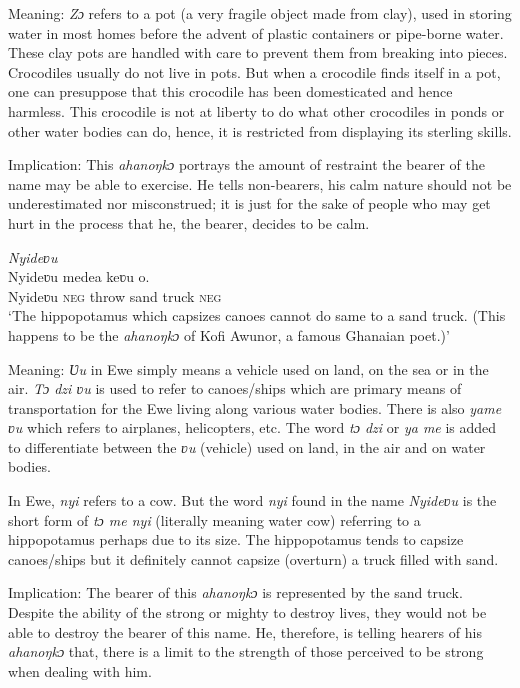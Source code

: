 \documentclass[output=paper]{langscibook}
\begin{document}
\noindent Meaning: \textit{Zɔ} refers to a pot (a very fragile object made from clay), used in storing water in most homes before the advent of plastic containers or pipe-borne water. These clay pots are handled with care to prevent them from breaking into pieces. Crocodiles usually do not live in pots. But when a crocodile finds itself in a pot, one can presuppose that this crocodile has been domesticated and hence harmless. This crocodile is not at liberty to do what other crocodiles in ponds or other water bodies can do, hence, it is restricted from displaying its sterling skills.

Implication: This {\textit{ahanoŋkɔ}} portrays the amount of restraint the bearer of the name may be able to exercise. He tells non-bearers, his calm nature should not be underestimated nor misconstrued; it is just for the sake of people who may get hurt in the process that he, the bearer, decides to be calm.

\ea
 \emph{Nyideʋu}\\
\gll Nyideʋu medea keʋu o.\\
Nyideʋu {\textsc{neg} throw} {sand truck} \textsc{neg}\\
\glt  ‘The hippopotamus which capsizes canoes cannot do same to a sand truck. (This happens to be the {\textit{ahanoŋkɔ}} of Kofi Awunor, a famous Ghanaian poet.)’
\z

\noindent Meaning: \textit{Ʋu} in Ewe simply means a vehicle used on land, on the sea or in the air. \textit{Tɔ dzi ʋu} is used to refer to canoes/ships which are primary means of transportation for the Ewe living along various water bodies. There is also \textit{yame ʋu} which refers to airplanes, helicopters, etc. The word \textit{tɔ dzi} or \textit{ya me} is added to differentiate between the \textit{ʋu} (vehicle) used on land, in the air and on water bodies.

In Ewe, \textit{nyi} refers to a cow. But the word \textit{nyi} found in the name \textit{Nyideʋu} is the short form of \textit{tɔ me nyi} (literally meaning water cow) referring to a hippopotamus perhaps due to its size. The hippopotamus tends to capsize canoes/ships but it definitely cannot capsize (overturn) a truck filled with sand.

Implication: The bearer of this {\textit{ahanoŋkɔ}} is represented by the sand truck. Despite the ability of the strong or mighty to destroy lives, they would not be able to destroy the bearer of this name. He, therefore, is telling hearers of his {\textit{ahanoŋkɔ}} that, there is a limit to the strength of those perceived to be strong when dealing with him.\pagebreak
\end{document}
